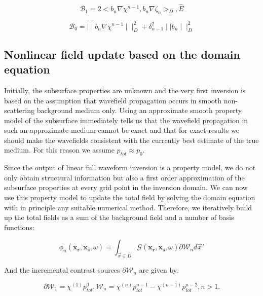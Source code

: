 \documentclass[10pt,a4paper]{article}
\begin{document}
\begin{equation} \label{eq:eq28} \mathcal{B}_1 = 2 < b_n \nabla\chi^{n-1}, b_n \nabla \zeta_n >_D, \hat{E} \end{equation} 

\begin{equation} \label{eq:eq29} \mathcal{B}_0 = \mid \mid b_n \nabla \chi^{n-1} \mid \mid^{2}_D + \delta^{2}_{n-1} \mid \mid b_n \mid \mid^{2}_D \end{equation} 

\subsection{Nonlinear field update based on the domain equation}

Initially, the subsurface properties are unknown  and the very first inversion is based on the assumption that wavefield propagation occurs in smooth non-scattering background medium only. Using an approximate smooth property model of the subsurface immediately tells us that the wavefield propagation in such an approximate medium cannot be exact and that for exact results we should make the wavefields consistent with the currently best estimate of the true medium. For this reason we assume $p_{tot} \approx p_0$.

Since the output of linear full waveform inversion is a property model, we do
not only obtain structural information but also a first order approximation of the subsurface properties at every grid point in the inversion domain. We can now use this property model to update the total field by solving the domain equation with in principle any suitable numerical method. Therefore, we iteratively build up the total fields as a sum of the background field and a number of basis functions:

\begin{equation} \label{eq:eq30} \phi_n (\mathbf{x_\text{r}},\mathbf{x_\text{s}},\omega) = \int_{\vec{x}\in D} \mathcal{G} (\mathbf{x_\text{r}},\mathbf{x_\text{s}},\omega)\partial \mathcal{W}_n d\vec{x}' \end{equation} 

And the incremental contrast sources $\partial \mathcal{W}_n$ are given by:

\begin{equation} \label{eq:eq31} \partial \mathcal{W}_1 = \chi^{(1)} p^{0}_{tot} , \mathcal{W}_n = \chi^{(n)} p^{n-1}_{tot} - \chi^{(n-1)} p^{n-2}_{tot}, n > 1. \end{equation} 
\end{document}
